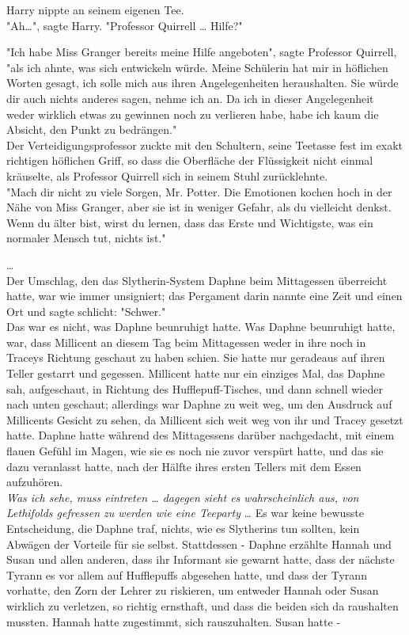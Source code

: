 {Harry nippte an seinem eigenen Tee.\\ "Ah…", sagte Harry. "Professor Quirrell … Hilfe?"

"Ich habe Miss Granger bereits meine Hilfe angeboten", sagte Professor Quirrell, "als ich ahnte, was sich entwickeln würde. Meine Schülerin hat mir in höflichen Worten gesagt, ich solle mich aus ihren Angelegenheiten heraushalten. Sie würde dir auch nichts anderes sagen, nehme ich an. Da ich in dieser Angelegenheit weder wirklich etwas zu gewinnen noch zu verlieren habe, habe ich kaum die Absicht, den Punkt zu bedrängen."\\ Der Verteidigungsprofessor zuckte mit den Schultern, seine Teetasse fest im exakt richtigen höflichen Griff, so dass die Oberfläche der Flüssigkeit nicht einmal kräuselte, als Professor Quirrell sich in seinem Stuhl zurücklehnte.\\ "Mach dir nicht zu viele Sorgen, Mr. Potter. Die Emotionen kochen hoch in der Nähe von Miss Granger, aber sie ist in weniger Gefahr, als du vielleicht denkst. Wenn du älter bist, wirst du lernen, dass das Erste und Wichtigste, was ein normaler Mensch tut, nichts ist."

…\\ Der Umschlag, den das Slytherin-System Daphne beim Mittagessen überreicht hatte, war wie immer unsigniert; das Pergament darin nannte eine Zeit und einen Ort und sagte schlicht: "Schwer."\\ Das war es nicht, was Daphne beunruhigt hatte. Was Daphne beunruhigt hatte, war, dass Millicent an diesem Tag beim Mittagessen weder in ihre noch in Traceys Richtung geschaut zu haben schien. Sie hatte nur geradeaus auf ihren Teller gestarrt und gegessen. Millicent hatte nur ein einziges Mal, das Daphne sah, aufgeschaut, in Richtung des Hufflepuff-Tisches, und dann schnell wieder nach unten geschaut; allerdings war Daphne zu weit weg, um den Ausdruck auf Millicents Gesicht zu sehen, da Millicent sich weit weg von ihr und Tracey gesetzt hatte. Daphne hatte während des Mittagessens darüber nachgedacht, mit einem flauen Gefühl im Magen, wie sie es noch nie zuvor verspürt hatte, und das sie dazu veranlasst hatte, nach der Hälfte ihres ersten Tellers mit dem Essen aufzuhören.\\ \emph{Was ich sehe, muss eintreten … dagegen sieht es wahrscheinlich aus, von Lethifolds gefressen zu werden wie eine Teeparty} … Es war keine bewusste Entscheidung, die Daphne traf, nichts, wie es Slytherins tun sollten, kein Abwägen der Vorteile für sie selbst. Stattdessen - Daphne erzählte Hannah und Susan und allen anderen, dass ihr Informant sie gewarnt hatte, dass der nächste Tyrann es vor allem auf Hufflepuffs abgesehen hatte, und dass der Tyrann vorhatte, den Zorn der Lehrer zu riskieren, um entweder Hannah oder Susan wirklich zu verletzen, so richtig ernsthaft, und dass die beiden sich da raushalten mussten. Hannah hatte zugestimmt, sich rauszuhalten. Susan hatte -

}
